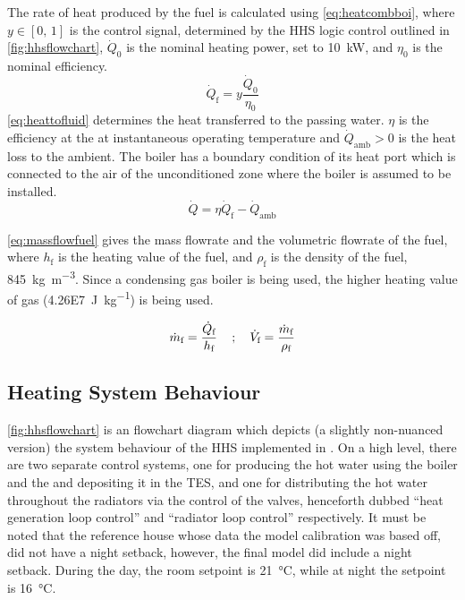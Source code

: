 The rate of heat produced by the fuel is calculated using \cref{eq:heatcombboi}, where $y \in [0\text{, }1]$ is the control signal, determined by the \ac{HHS} logic control outlined in \cref{fig:hhsflowchart}, $\dot{Q}_0$ is the nominal heating power, set to \qty{10}{\kilo\watt}, and $\eta_0$ is the nominal efficiency.
\begin{equation}
    \dot{Q}_\text{f} = y \frac{\dot{Q}_0}{\eta_0}\label{eq:heatcombboi}
\end{equation}
\cref{eq:heattofluid} determines the heat transferred to the passing water. $\eta$ is the efficiency at the at instantaneous operating temperature and $\dot{Q}_\text{amb} > 0 $ is the heat loss to the ambient. The boiler has a boundary condition of its heat port which is connected to the air of the unconditioned zone where the boiler is assumed to be installed.  
\begin{equation}
    \dot{Q} = \eta \dot{Q}_\text{f} - \dot{Q}_\text{amb}\label{eq:heattofluid}
\end{equation}

\cref{eq:massflowfuel} gives the mass flowrate and the volumetric flowrate of the fuel, where $h_\text{f}$ is the heating value of the fuel, and $\rho_\text{f}$ is the density of the fuel, \qty{845}{\kilo\gram\per\cubic\meter}. Since a condensing gas boiler is being used, the higher heating value of gas (\qty{4.26E7}{\joule\per\kilo\gram}) is being used.

 \begin{equation}
    \dot{m}_\text{f} =\frac{\dot{Q}_\text{f}}{h_\text{f}}\label{eq:massflowfuel}\text{\;\;\; ; \;\;\;} \dot{V}_\text{f} =\frac{\dot{m}_\text{f}}{\rho_\text{f}}
 \end{equation}


\subsection{Heating System Behaviour}
\cref{fig:hhsflowchart} is an flowchart diagram which depicts (a slightly non-nuanced version) the system behaviour of the \ac{HHS} implemented in \modelica. 
On a high level, there are two separate control systems, one for producing the hot water using the boiler and the \HP and depositing it in the \ac{TES}, and one for distributing the hot water throughout the radiators via the control of the valves, henceforth dubbed ``heat generation loop control'' and ``radiator loop control'' respectively. It must be noted that the reference house whose data the model  calibration was based off, did not have a night setback, however, the final model did include a night setback. During the day, the room setpoint is \qty{21}{\celsius}, while at night the setpoint is \qty{16}{\celsius}.

